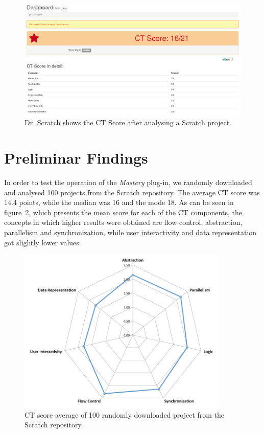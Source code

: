 \documentclass[a4paper,11pt]{article}
\begin{document}
\begin{figure}
  \centering
    \includegraphics[width=13cm]{img/results.png}
    \caption{Dr. Scratch shows the CT Score after analysing a Scratch project.}
    \label{fig:drscratch}
\end{figure}

\section{Preliminar Findings}
\label{sec:findings}

In order to test the operation of the \textit{Mastery} plug-in, we randomly downloaded and analysed 100 projects from the Scratch repository. The average CT score was 14.4 points, while the median was 16 and the mode 18. As can be seen in figure~\ref{fig:scores}, which presents the mean score for each of the CT components, the concepts in which higher results were obtained are flow control, abstraction, parallelism and synchronization, while user interactivity and data representation got slightly lower values.
\begin{figure}
  \centering
    \includegraphics[width=10cm]{img/spider.png}
    \caption{CT score average of 100 randomly downloaded project from the Scratch repository.}
    \label{fig:scores}
\end{figure}
\end{document}
